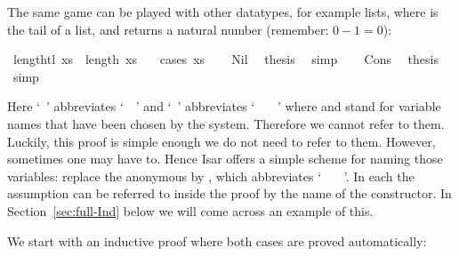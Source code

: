 \begin{isabellebody}
\begin{isamarkuptext}
The same game can be played with other datatypes, for example lists,
where  is the tail of a list, and  returns a
natural number (remember: $0-1=0$):%
\end{isamarkuptext}%
\isamarkupfalse%
\ {\isachardoublequote}length{\isacharparenleft}tl\ xs{\isacharparenright}\ {\isacharequal}\ length\ xs\ {\isacharminus}\ {}{\isachardoublequote}\isanewline
%
\isadelimproof
%
\endisadelimproof
%
\isatagproof
\isamarkupfalse%
\ {\isacharparenleft}cases\ xs{\isacharparenright}\isanewline
\ \ \isamarkupfalse%
\ Nil\ \isamarkupfalse%
\ {\isacharquery}thesis\ \isamarkupfalse%
\ simp\isanewline
\isamarkupfalse%
\isanewline
\ \ \isamarkupfalse%
\ Cons\ \isamarkupfalse%
\ {\isacharquery}thesis\ \isamarkupfalse%
\ simp\isanewline
\isamarkupfalse%
%
\endisatagproof
{\isafoldproof}%
%
\isadelimproof
%
\endisadelimproof
\isamarkuptrue%
%
\begin{isamarkuptext}%
\noindent Here `~' abbreviates
`~~' and
`~'
abbreviates `~\isa{{\isacharquery}\ {\isacharquery}{\isacharquery}}
~~'
where \isa{{\isacharquery}} and \isa{{\isacharquery}{\isacharquery}}
stand for variable names that have been chosen by the system.
Therefore we cannot refer to them.
Luckily, this proof is simple enough we do not need to refer to them.
However, sometimes one may have to. Hence Isar offers a simple scheme for
naming those variables: replace the anonymous  by
, which abbreviates `~
~~'.
In each  the assumption can be
referred to inside the proof by the name of the constructor. In
Section~\ref{sec:full-Ind} below we will come across an example
of this.%
\end{isamarkuptext}%
\isamarkuptrue%
%
\isamarkuptrue%
%
\begin{isamarkuptext}%
We start with an inductive proof where both cases are proved automatically:%
\end{isamarkuptext}%

\end{isabellebody}
